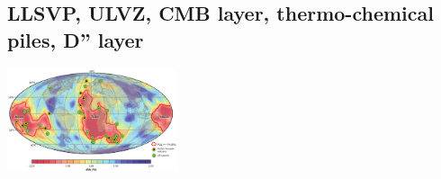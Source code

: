 \subsection{LLSVP, ULVZ, CMB layer, thermo-chemical piles, D'' layer}

\begin{center}
\includegraphics[width=5cm]{images/burk11}\cite{burk11}
\end{center}

